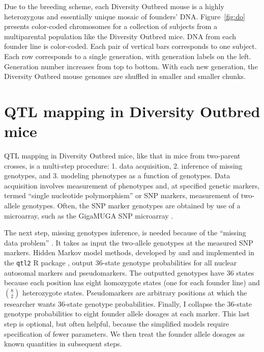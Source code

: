 \documentclass[oneside]{book}\usepackage[]{graphicx}\usepackage[]{color}
\begin{document}
\begin{titlepage}
Due to the breeding scheme, each Diversity Outbred mouse is a highly
heterozygous and essentially unique mosaic of
founders' DNA. Figure~\ref{fig:do} presents color-coded chromosomes for a collection of
subjects from a multiparental population like the Diversity Outbred mice. DNA from each founder
line is color-coded. Each pair of vertical bars corresponds to one subject. Each row corresponds to a single generation, with generation labels on the left. Generation number increases from top to bottom.
With each new generation, the Diversity Outbred mouse genomes are shuffled
in smaller and smaller chunks.

\section{QTL mapping in Diversity Outbred mice}\label{sec:do-qtl}

QTL mapping in Diversity Outbred mice, like that in mice from two-parent
crosses, is a multi-step procedure: 1. data acquisition, 2. inference of
missing genotypes, and 3. modeling phenotypes as a function of genotypes.
Data acquisition involves measurement of phenotypes and, at specified
genetic markers, termed ``single nucleotide polymorphism'' or SNP markers,
measurement of two-allele genotypes. Often, the SNP marker genotypes are
obtained by use of a microarray, such as the GigaMUGA SNP microarray
\citep{morgan2015mouse}.

The next step, missing genotypes inference, is needed because of the
``missing data problem'' \citep{broman2009guide}. It takes as input the two-allele
genotypes at the measured SNP markers. Hidden Markov model methods, developed by
\citet{broman2012haplotype} and \citet{broman2012genotype} and implemented in the \texttt{qtl2} R
package \citep{broman2019rqtl2}, output 36-state genotype probabilities for all
nuclear autosomal markers and pseudomarkers. The outputted genotypes have 36 states
because each position has eight homozygote states (one for each founder line) and $\binom{8}{2}$ heterozygote states. Pseudomarkers are
arbitrary positions at which the researcher wants 36-state genotype probabilities.
Finally, I collapse the 36-state genotype probabilities to eight founder allele
dosages at each marker. This last step is optional, but often helpful, because the
simplified models require specification of fewer parameters. We then treat the
founder allele dosages as known quantities in subsequent steps.



\end{titlepage}
\end{document}
